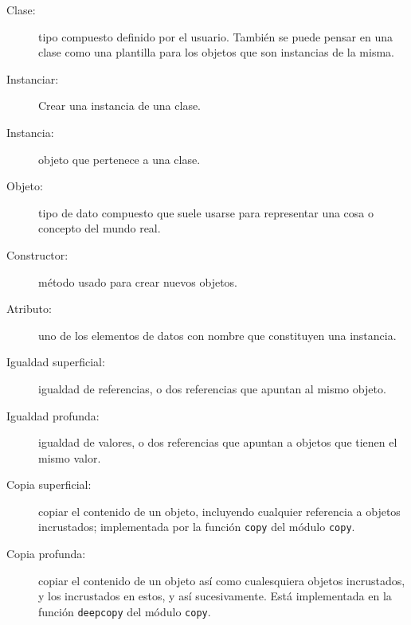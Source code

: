 \begin{description}

\item[Clase:] tipo compuesto definido por el usuario. También se puede pensar en una
clase como una plantilla para los objetos que son instancias de la misma.

\item[Instanciar:] Crear una instancia de una clase.

\item[Instancia:] objeto que pertenece a una clase.

\item[Objeto:] tipo de dato compuesto que suele usarse para representar
una cosa o concepto del mundo real.

\item[Constructor:] método usado para crear nuevos objetos.

\item[Atributo:] uno de los elementos de datos con nombre que
constituyen una instancia.

\item[Igualdad superficial:] igualdad de referencias, o dos referencias
que apuntan al mismo objeto.

\item[Igualdad profunda:] igualdad de valores, o dos referencias que apuntan
a objetos que tienen el mismo valor.

\item[Copia superficial:] copiar el contenido de un objeto, incluyendo
cualquier referencia a objetos incrustados; implementada por la función \texttt{copy}
del módulo \texttt{copy}.

\item[Copia profunda:] copiar el contenido de un objeto así como cualesquiera
objetos incrustados, y los incrustados en estos, y así sucesivamente. Está implementada en la función \texttt{deepcopy} del módulo \texttt{copy}.


\end{description}
